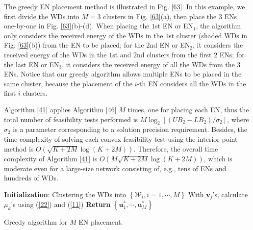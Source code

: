 \documentclass[journal, draftcls, one column, 12pt]{IEEEtran}
\begin{document}
The greedy EN placement method is illustrated in Fig. \ref{63}. In this example, we first divide the WDs into $M=3$ clusters in Fig. \ref{63}(a), then place the $3$ ENs one-by-one in Fig. \ref{63}(b)-(d). When placing the $1$st EN or EN$_1$, the algorithm only considers the received energy of the WDs in the $1$st cluster (shaded WDs in Fig. \ref{63}(b)) from the EN to be placed; for the $2$nd EN or EN$_2$, it considers the received energy of the WDs in the $1$st and $2$nd clusters from the first $2$ ENs; for the last EN or EN$_3$, it considers the received energy of all the WDs from the $3$ ENs. Notice that our greedy algorithm allows multiple ENs to be placed in the same cluster, because the placement of the $i$-th EN considers all the WDs in the first $i$ clusters.

Algorithm \ref{41} applies Algorithm \ref{46} $M$ times, one for placing each EN, thus the total number of feasibility tests performed is $M\log_2\left[\left(UB_2-LB_2\right)/\sigma_2\right]$, where $\sigma_2$ is a parameter corresponding to a solution precision requirement. Besides, the time complexity of solving each convex feasibility test using the interior point method is $O\left(\sqrt{K+2M}\log \left(K+2M\right)\right)$\cite{2004:Boyd}. Therefore, the overall time complexity of Algorithm \ref{41} is $O\left(M\sqrt{K+2M}\log \left(K+2M\right)\right)$, which is moderate even for a large-size network consisting of, e.g., tens of ENs and hundreds of WDs.

\begin{algorithm}
\footnotesize
\SetAlgoLined

 \textbf{Initialization}:
  Clustering the WDs into $\left\{\mathcal{W}_i, i=1,\cdots,M\right\}$ \;
  With $\mathbf{v}_j$'s, calculate $\mu_k$'s using (\ref{22}) and (\ref{11})\;
\textbf{Return} $\left\{\mathbf{u}_1^*,\cdots,\mathbf{u}_M^*\right\}$
\caption{Greedy algorithm for $M$ EN placement.}
\label{41}
\end{algorithm}
\end{document}
